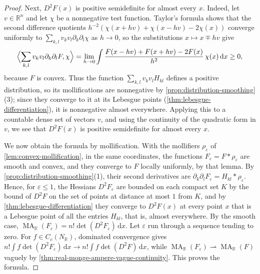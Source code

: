 \begin{proof}
Next, $D^2F(x)$ is positive semidefinite for almost every $x$. Indeed, let $v\in\mathbb R^n$ and let $\chi$ be a nonnegative test function. Taylor's formula shows that the second difference quotients $h^{-2}(\chi(x+hv)+\chi(x-hv)-2\chi(x))$ converge uniformly to $\sum_{k,l}v_kv_l\partial_k\partial_l\chi$ as $h\to0$, so the substitutions $x\mapsto x\mp hv$ give
\[
 \Bigl\langle\sum_{k,l}v_kv_l\partial_k\partial_lF,\chi\Bigr\rangle=\lim_{h\to0}\int\frac{F(x-hv)+F(x+hv)-2F(x)}{h^2}\,\chi(x)\,\mathrm dx\geq0,
\]
because $F$ is convex. Thus the function $\sum_{k,l}v_kv_lH_{kl}$ defines a positive distribution, so its mollifications are nonnegative by \cref{prop:distribution-smoothing}(3); since they converge to it at its Lebesgue points (\cref{thm:lebesgue-differentiation}), it is nonnegative almost everywhere. Applying this to a countable dense set of vectors $v$, and using the continuity of the quadratic form in $v$, we see that $D^2F(x)$ is positive semidefinite for almost every $x$.

We now obtain the formula by mollification. With the mollifiers $\rho_\varepsilon$ of \cref{lem:convex-mollification}, in the same coordinates, the functions $F_\varepsilon=F*\rho_\varepsilon$ are smooth and convex, and they converge to $F$ locally uniformly, by that lemma. By \cref{prop:distribution-smoothing}(1), their second derivatives are $\partial_k\partial_lF_\varepsilon=H_{kl}*\rho_\varepsilon$. Hence, for $\varepsilon\leq1$, the Hessians $D^2F_\varepsilon$ are bounded on each compact set $K$ by the bound of $D^2F$ on the set of points at distance at most $1$ from $K$, and by \cref{thm:lebesgue-differentiation} they converge to $D^2F(x)$ at every point $x$ that is a Lebesgue point of all the entries $H_{kl}$, that is, almost everywhere. By the smooth case, $\operatorname{MA}_{\mathbb R}(F_\varepsilon)=n!\det(D^2F_\varepsilon)\,\mathrm dx$. Let $\varepsilon$ run through a sequence tending to zero. For $f\in C_c(N_{\mathbb R})$, dominated convergence gives $n!\int f\det(D^2F_\varepsilon)\,\mathrm dx\to n!\int f\det(D^2F)\,\mathrm dx$, while $\operatorname{MA}_{\mathbb R}(F_\varepsilon)\rightharpoonup\operatorname{MA}_{\mathbb R}(F)$ vaguely by \cref{thm:real-monge-ampere-vague-continuity}. This proves the formula.


\end{proof}
